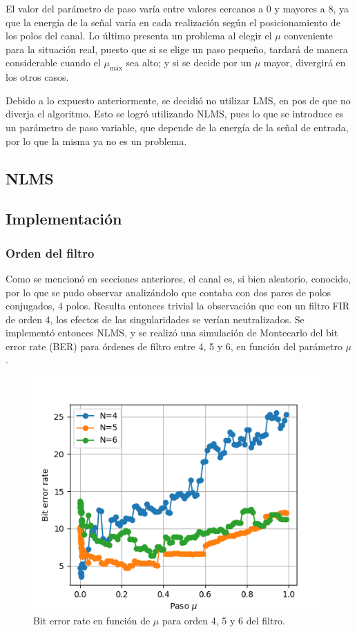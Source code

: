 \documentclass[main.tex]{subfiles}
\begin{document}
El valor del parámetro de paso varía entre valores cercanos a 0 y mayores a 8, 
ya que la energ\'ia de la se\~nal var\'ia en cada realizaci\'on seg\'un el posicionamiento de los polos del canal. Lo último presenta un problema al elegir el $\mu$ conveniente para la situación real,
puesto que si se elige un paso pequeño, tardará de manera considerable cuando el $\mu_\text{máx}$ sea alto;
y si se decide por un $\mu$ mayor, divergirá en los otros casos. \newline

Debido a lo expuesto anteriormente, se decidió no utilizar LMS, en pos de que no diverja el algoritmo. 
Esto se logró utilizando NLMS, pues lo que se introduce es un parámetro de paso variable, que depende
de la energía de la señal de entrada, por lo que la misma ya no es un problema.

\subsection*{NLMS}
\subsection*{Implementación}
\subsubsection*{Orden del filtro}
Como se mencionó en secciones anteriores, el canal es, si bien aleatorio, conocido, por 
lo que se pudo observar analizándolo que contaba con dos pares de polos conjugados, 4 polos.
Resulta entonces trivial la observación que con un filtro FIR de orden 4, los efectos 
de las singularidades se verían neutralizados. Se implementó entonces NLMS, y se realizó
una simulación de Montecarlo del bit error rate (BER) para órdenes de filtro entre 4, 5 y 6, en función del parámetro 
$\mu$.

\begin{figure}[H]
    \centering
    \includegraphics[scale=0.6]{imagenes/N_filter.png}
    \caption{Bit error rate en función de $\mu$ para orden 4, 5 y 6 del filtro.}
\end{figure}
\end{document}
